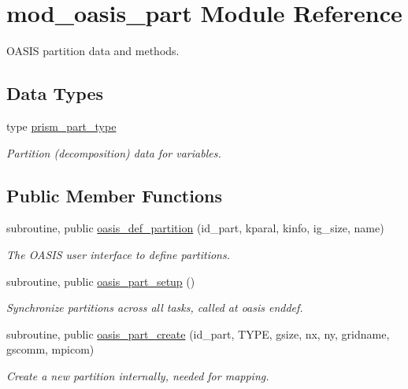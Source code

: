 \hypertarget{classmod__oasis__part}{\section{mod\+\_\+oasis\+\_\+part Module Reference}
\label{classmod__oasis__part}
}


O\+A\+S\+I\+S partition data and methods.  


\subsection*{Data Types}
\begin{DoxyCompactItemize}
\item 
type \hyperlink{structmod__oasis__part_1_1prism__part__type}{prism\+\_\+part\+\_\+type}
\begin{DoxyCompactList}\small\item\em Partition (decomposition) data for variables. \end{DoxyCompactList}\end{DoxyCompactItemize}
\subsection*{Public Member Functions}
\begin{DoxyCompactItemize}
\item 
subroutine, public \hyperlink{classmod__oasis__part_af070605328f2b705735d7fbf8b838ff4}{oasis\+\_\+def\+\_\+partition} (id\+\_\+part, kparal, kinfo, ig\+\_\+size, name)
\begin{DoxyCompactList}\small\item\em The O\+A\+S\+I\+S user interface to define partitions. \end{DoxyCompactList}\item 
subroutine, public \hyperlink{classmod__oasis__part_a80f66cc0ce5857aa53d070861f05b521}{oasis\+\_\+part\+\_\+setup} ()
\begin{DoxyCompactList}\small\item\em Synchronize partitions across all tasks, called at oasis enddef. \end{DoxyCompactList}\item 
subroutine, public \hyperlink{classmod__oasis__part_a441af70f9f13c8e72575f00f3ddcc49c}{oasis\+\_\+part\+\_\+create} (id\+\_\+part, T\+Y\+P\+E, gsize, nx, ny, gridname, gscomm, mpicom)
\begin{DoxyCompactList}\small\item\em Create a new partition internally, needed for mapping. \end{DoxyCompactList}\end{DoxyCompactItemize}
